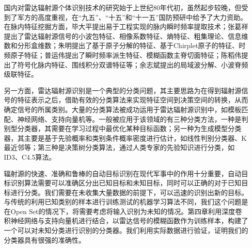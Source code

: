 国内对雷达辐射源个体识别技术的研究始于上世纪80年代初，虽然起步较晚，但受到了军方的高度重视，在“九五”、“十五”和“十一五”国防预研中给予了大力资助。在脉内特征挖掘方面，毕大平提出易于工程实现的脉内瞬时频率提取技术\cite{毕大平2005基于瞬时频率的脉内调制识别技术}；张葛祥提出了雷达辐射源信号的小波包特征\cite{张葛祥2006基于小波包变换和特征选择的雷达辐射源信号识别}、相像系数特征\cite{张葛祥2005基于相像系数的雷达辐射源信号特征选择}、熵特征\cite{张葛祥2005基于熵特征的雷达辐射源信号识别}、粗集理论\cite{张葛祥2005基于粗集理论的雷达辐射源信号识别}、信息维数\cite{张葛祥2005雷达辐射源信号智能识别方法研究}和分形盒维数\cite{张葛祥2003雷达辐射源信号分形特征研究,张葛祥2004雷达辐射源信号脉内特征分析}；朱明提出了基于原子分解的特征\cite{朱明2007基于原子分解的辐射源信号二次特征提取}、基于Chirplet原子的特征、时频原子特征\cite{朱明2009一种基于}；普运伟提出了瞬时频率派生特征\cite{普运伟2009雷达辐射源信号瞬时频率派生特征分类方法}、模糊函数主脊切面特征\cite{普运伟2008雷达辐射源信号模糊函数主脊切面特征提取方法}；陈稻伟提出了符号化脉内特征\cite{陈韬伟2008雷达辐射源信号符号化脉内特征提取方法}、围线积分双谱特征\cite{陈韬伟2013基于围线积分双谱的雷达辐射源信号个体特征提取}等；余志斌提出的局域波分解\cite{余志斌2008基于局域波分解的雷达辐射源信号时频分析}、小波脊频级联特征\cite{余志斌2010一种新的,余志斌2010基于小波脊频级联特征的雷达辐射源信号识别}。

另一方面，雷达辐射源识别是一个典型的分类问题，其主要思路为在得到辐射源信号的特征表示之后，借助有效的分类算法来实现特征空间到决策空间的转换，从而确定信号的所属类别。大量的分类算法被成功运用于雷达辐射源识别中，如模板匹配\cite{dudczyk2015fast,dudczyk2004applying}、神经网络\cite{jouny1993classification,petrov2013identification,shieh2002vector,willson1990radar}、支持向量机\cite{ren2008radar}等。一般被应用于该领域的有三种分类方法，一种是判别型分类器，其需要在学习过程中最优化某种目标函数；另一种为生成模型分类器，其主要是基于先验概率和类别条件概率密度进行估计，如线性判别分类器\cite{mika1999fisher}、K最近邻\cite{cover1967nearest}等；第三种是决策树分类算法，通过人类专家的先验知识进行分类，如ID3、C4.5算法\cite{quinlan1996bagging,lyden1999id1}。

辐射源的快速、准确和鲁棒的自动目标识别在现代军事中的作用十分重要，自动目标识别算法需要可以准确区分出已知目标和未知目标，同时可以正确的对于已知目标进行分类。我们需要在未收集大量数据的前提下，可以迅速的识别出新的目标。与传统的利用已知类别的样本进行训练测试的机器学习算法不同，我们这个问题是在Open Set的情况下，将需要考虑将输入识别为未知的情况。第四章利用深度卷积神经网络与支持向量机进行结合，以雷达信号的模糊函数作为训练样本，构建了一个可以对未知分类进行识别的分类器。我们利用实际数据进行验证，证明我们的分类器具有很强的准确性。

